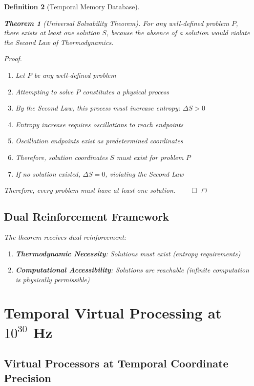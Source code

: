 \documentclass[12pt]{article}
\newtheorem{theorem}{Theorem}[section]
\newtheorem{definition}[theorem]{Definition}
\begin{document}
\begin{definition}[Temporal Memory Database]
\begin{theorem}[Universal Solvability Theorem]
For any well-defined problem $P$, there exists at least one solution $S$, because the absence of a solution would violate the Second Law of Thermodynamics.
\end{theorem}

\begin{proof}
\begin{enumerate}
    \item Let $P$ be any well-defined problem
    \item Attempting to solve $P$ constitutes a physical process
    \item By the Second Law, this process must increase entropy: $\Delta S > 0$
    \item Entropy increase requires oscillations to reach endpoints
    \item Oscillation endpoints exist as predetermined coordinates
    \item Therefore, solution coordinates $S$ must exist for problem $P$
    \item If no solution existed, $\Delta S = 0$, violating the Second Law
\end{enumerate}
Therefore, every problem must have at least one solution. $\qed$
\end{proof}

\subsection{Dual Reinforcement Framework}

The theorem receives dual reinforcement:
\begin{enumerate}
    \item \textbf{Thermodynamic Necessity}: Solutions must exist (entropy requirements)
    \item \textbf{Computational Accessibility}: Solutions are reachable (infinite computation is physically permissible)
\end{enumerate}

\section{Temporal Virtual Processing at $10^{30}$ Hz}

\subsection{Virtual Processors at Temporal Coordinate Precision}


\end{definition}
\end{document}
